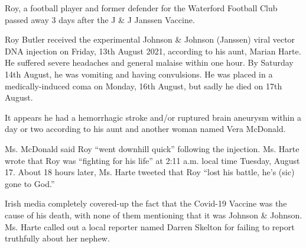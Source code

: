 Roy, a football player and former defender for the Waterford Football Club
passed away 3 days after the J \& J Janssen Vaccine.

Roy Butler received the experimental Johnson \& Johnson (Janssen) viral vector
DNA injection on Friday, 13th August 2021, according to his aunt, Marian
Harte. He suffered severe headaches and general malaise within one hour. By
Saturday 14th August, he was vomiting and having convulsions. He was placed in a
medically-induced coma on Monday, 16th August, but sadly he died on 17th August.

It appears he had a hemorrhagic stroke and/or ruptured brain aneurysm within a
day or two according to his aunt and another woman named Vera McDonald.

Ms. McDonald said Roy ``went downhill quick'' following the injection. Ms. Harte
wrote that Roy was ``fighting for his life'' at 2:11 a.m. local time Tuesday,
August 17. About 18 hours later, Ms. Harte tweeted that Roy ``lost his battle,
he’s (sic) gone to God.''

Irish media completely covered-up the fact that the Covid-19 Vaccine was the
cause of his death, with none of them mentioning that it was Johnson \&
Johnson. Ms. Harte called out a local reporter named Darren Skelton for failing
to report truthfully about her nephew.

